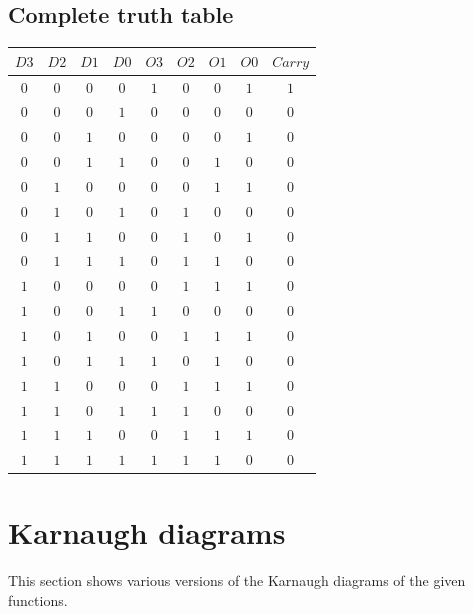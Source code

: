 \documentclass [15pt,a4paper,twoside]{article}
\begin{document}
\subsection{Complete truth table}
\begin{center}
\begin{tabular}{cccc|ccccc}
$D3$&$D2$&$D1$&$D0$&$O3$&$O2$&$O1$&$O0$&$Carry$\\
\hline
$0$&$0$&$0$&$0$&$1$&$0$&$0$&$1$&$1$\\
$0$&$0$&$0$&$1$&$0$&$0$&$0$&$0$&$0$\\
$0$&$0$&$1$&$0$&$0$&$0$&$0$&$1$&$0$\\
$0$&$0$&$1$&$1$&$0$&$0$&$1$&$0$&$0$\\
$0$&$1$&$0$&$0$&$0$&$0$&$1$&$1$&$0$\\
$0$&$1$&$0$&$1$&$0$&$1$&$0$&$0$&$0$\\
$0$&$1$&$1$&$0$&$0$&$1$&$0$&$1$&$0$\\
$0$&$1$&$1$&$1$&$0$&$1$&$1$&$0$&$0$\\
$1$&$0$&$0$&$0$&$0$&$1$&$1$&$1$&$0$\\
$1$&$0$&$0$&$1$&$1$&$0$&$0$&$0$&$0$\\
$1$&$0$&$1$&$0$&$0$&$1$&$1$&$1$&$0$\\
$1$&$0$&$1$&$1$&$1$&$0$&$1$&$0$&$0$\\
$1$&$1$&$0$&$0$&$0$&$1$&$1$&$1$&$0$\\
$1$&$1$&$0$&$1$&$1$&$1$&$0$&$0$&$0$\\
$1$&$1$&$1$&$0$&$0$&$1$&$1$&$1$&$0$\\
$1$&$1$&$1$&$1$&$1$&$1$&$1$&$0$&$0$\\

\end{tabular}
\end{center}
\section{Karnaugh diagrams}
This section shows various versions of the Karnaugh diagrams of the given functions.
\end{document}
